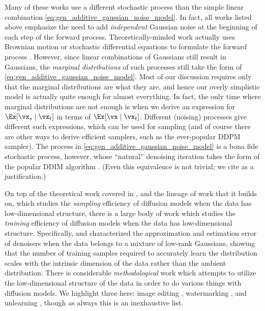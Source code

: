 \documentclass[../../book-main.tex]{subfiles}
\begin{document}
Many of these works use a different stochastic process than the simple linear combination \eqref{eq:gen_additive_gaussian_noise_model}. In fact, all works listed above emphasize the need to add \textit{independent} Gaussian noise at the beginning of each step of the forward process. Theoretically-minded work actually uses Brownian motion or stochastic differential equations to formulate the forward process \cite{song2020score}. However, since linear combinations of Gaussians still result in Gaussians, the \textit{marginal distributions} of such processes still take the form of \eqref{eq:gen_additive_gaussian_noise_model}. Most of our discussion requires only that the marginal distributions are what they are, and hence our overly simplistic model is actually quite enough for almost everything. In fact, the only time where marginal distributions are not enough is when we derive an expression for \(\Ex[\vx_{s} \mid \vx_{t}]\) in terms of \(\Ex[\vx \mid \vx_{t}]\). Different (noising) processes give different such expressions, which can be used for sampling (and of course there are other ways to derive efficient samplers, such as the ever-popular DDPM sampler). The process in \eqref{eq:gen_additive_gaussian_noise_model} is a bona fide stochastic process, however, whose ``natural'' denoising iteration takes the form of the popular DDIM algorithm \cite{song2020denoising}. (Even this equivalence is not trivial; we cite \cite{de2025distributional} as a justification.) 


On top of the theoretical work \citep{li2024d} covered in , and the lineage of work that it builds on, which studies the \textit{sampling} efficiency of diffusion models when the data has low-dimensional structure, there is a large body of work which studies the \textit{training} efficiency of diffusion models when the data has low-dimensional structure. Specifically, \citet{chen2023score} and \citep{wang2024diffusion} characterized the approximation and estimation error of denoisers when the data belongs to a mixture of low-rank Gaussians, showing that the number of training samples required to accurately learn the distribution scales with the intrinsic dimension of the data rather than the ambient distribution. There is considerable \textit{methodological} work which attempts to utilize the low-dimensional structure of the data in order to do various things with diffusion models. We highlight three here: image editing \citep{chen2024exploring}, watermarking \citep{li2024shallow}, and unlearning \citep{chen2025dual}, though as always this is an inexhaustive list.
\end{document}
